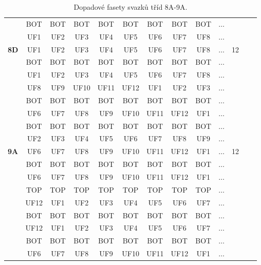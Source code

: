 \begin{table}[h!]
\begin{tabular}{|l|c|c|c|c|c|c|c|c|c|c|c|c|}
 & BOT & BOT & BOT & BOT & BOT & BOT & BOT & BOT & $\dots$ & \\
 & UF1 & UF2 & UF3 & UF4 & UF5 & UF6 & UF7 & UF8 & $\dots$ & \\
\hline \hline
\textbf{8D} & UF1 & UF2 & UF3 & UF4 & UF5 & UF6 & UF7 & UF8 & $\dots$ & 12\\
 & BOT & BOT & BOT & BOT & BOT & BOT & BOT & BOT & $\dots$ & \\
 & UF1 & UF2 & UF3 & UF4 & UF5 & UF6 & UF7 & UF8 & $\dots$ & \\
 & UF8 & UF9 & UF10 & UF11 & UF12 & UF1 & UF2 & UF3 & $\dots$ & \\
 & BOT & BOT & BOT & BOT & BOT & BOT & BOT & BOT & $\dots$ & \\
 & UF6 & UF7 & UF8 & UF9 & UF10 & UF11 & UF12 & UF1 & $\dots$ & \\
 & BOT & BOT & BOT & BOT & BOT & BOT & BOT & BOT & $\dots$ & \\
 & UF2 & UF3 & UF4 & UF5 & UF6 & UF7 & UF8 & UF9 & $\dots$ & \\
\hline \hline
\textbf{9A} & UF6 & UF7 & UF8 & UF9 & UF10 & UF11 & UF12 & UF1 & $\dots$ & 12\\
 & BOT & BOT & BOT & BOT & BOT & BOT & BOT & BOT & $\dots$ & \\
 & UF6 & UF7 & UF8 & UF9 & UF10 & UF11 & UF12 & UF1 & $\dots$ & \\
 & TOP & TOP & TOP & TOP & TOP & TOP & TOP & TOP & $\dots$ & \\
 & UF12 & UF1 & UF2 & UF3 & UF4 & UF5 & UF6 & UF7 & $\dots$ & \\
 & BOT & BOT & BOT & BOT & BOT & BOT & BOT & BOT & $\dots$ & \\
 & UF12 & UF1 & UF2 & UF3 & UF4 & UF5 & UF6 & UF7 & $\dots$ & \\
 & BOT & BOT & BOT & BOT & BOT & BOT & BOT & BOT & $\dots$ & \\
 & UF6 & UF7 & UF8 & UF9 & UF10 & UF11 & UF12 & UF1 & $\dots$ & \\
\hline 
\end{tabular}
\caption{Dopadové fasety svazků tříd 8A-9A.}
\label{table:TableClasses4}
\end{table}

